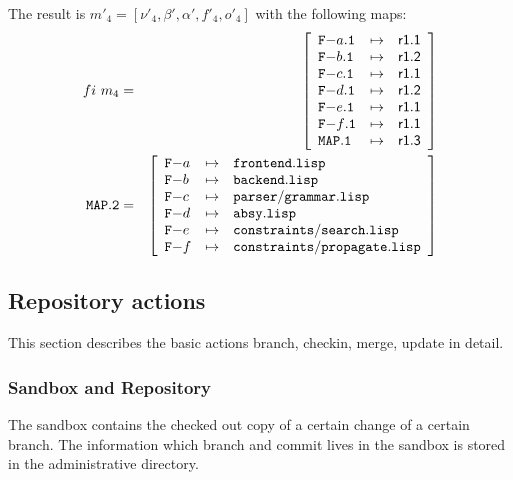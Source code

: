 \documentclass[fleqn, 10pt, a4paper]{report}
\begin{document}
The result is $m'_4=[\nu'_4, \beta', \alpha', f'_4, o'_4]$ with the
following maps:
\begin{eqnarray*}
\mathnormal{fi}\ m_4 &=& \left[
\begin{array}{lcl}
\mathtt{F-}a\mathtt{.1} & \mapsto & \mathsf{r1.1} \\
\mathtt{F-}b\mathtt{.1} & \mapsto & \mathsf{r1.2} \\
\mathtt{F-}c\mathtt{.1} & \mapsto & \mathsf{r1.1} \\
\mathtt{F-}d\mathtt{.1} & \mapsto & \mathsf{r1.2} \\
\mathtt{F-}e\mathtt{.1} & \mapsto & \mathsf{r1.1} \\
\mathtt{F-}f\mathtt{.1} & \mapsto & \mathsf{r1.1} \\
\mathtt{MAP.1}         & \mapsto & \mathsf{r1.3} \\
\end{array}\right] \\
\mathtt{MAP.2} &=& \left[
\begin{array}{lcl}
\mathtt{F-}a &\mapsto& \mathtt{frontend.lisp} \\
\mathtt{F-}b &\mapsto& \mathtt{backend.lisp} \\
\mathtt{F-}c &\mapsto& \mathtt{parser/grammar.lisp} \\
\mathtt{F-}d &\mapsto& \mathtt{absy.lisp} \\
\mathtt{F-}e &\mapsto& \mathtt{constraints/search.lisp} \\
\mathtt{F-}f &\mapsto& \mathtt{constraints/propagate.lisp} \\
\end{array}\right]
\end{eqnarray*}


\subsection{Repository actions \label{ops}}

This section describes the basic actions branch, checkin, merge,
update in detail.

\subsubsection{Sandbox and Repository}

The sandbox contains the checked out copy of a certain change
of a certain branch. The information which branch and
commit lives in the sandbox is stored in the administrative
directory.
\end{document}
